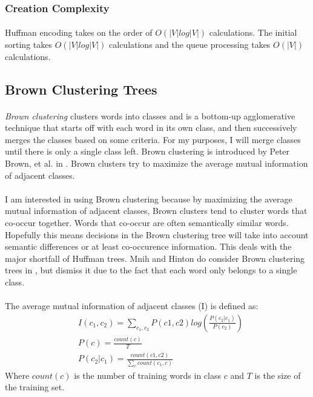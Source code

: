 \documentclass[12pt]{ociamthesis}  %
\begin{document}
\subsubsection{Creation Complexity}
\paragraph{}
Huffman encoding takes on the order of $O\left(|V| log |V| \right)$ calculations. The initial sorting takes $O\left(|V| log |V|\right)$ calculations and the queue processing takes $O(|V|)$ calculations.

\subsection{Brown Clustering Trees}
\paragraph{}
\emph{Brown clustering} clusters words into classes and is a bottom-up agglomerative technique that starts off with each word in its own class, and then successively merges the classes based on some criteria. For my purposes, I will merge classes until there is only a single class left.  Brown clustering is introduced by Peter Brown, et al. in \cite{Brown1992}.
Brown clusters try to maximize the average mutual information of adjacent classes.
\paragraph{}
I am interested in using Brown clustering because by maximizing the average mutual information of adjacent classes, Brown clusters tend to cluster words that co-occur together. Words that co-occur are often semantically similar words. Hopefully this means decisions in the Brown clustering tree will take into account semantic differences or at least co-occurence information. This deals with the major shortfall of Huffman trees. Mnih and Hinton do consider Brown clustering trees in \cite{MnihHinton2009}, but dismiss it due to the fact that each word only belongs to a single class. 
\paragraph{}
The average mutual information of adjacent classes (I) is defined as:
\begin{align}
& I(c_1,c_2) =\sum_{c_1,c_2} P(c1,c2)  log \left( \frac{P(c_2|c_1)}{P(c_2)} \right)
\\
&P(c) = \frac{count(c)}{T} \nonumber
\\
&P(c_2|c_1) = \frac{count(c1,c2)}{\sum_c count(c_1,c)} \nonumber
\end{align}
Where $count(c)$ is the number of training words in class $c$ and $T$ is the size of the training set.
\end{document}

